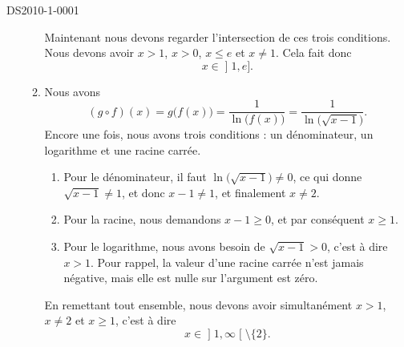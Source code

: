 \begin{corrige}{DS2010-1-0001}
\begin{enumerate}
\begin{enumerate}
\begin{enumerate}
					\end{enumerate}
					Maintenant nous devons regarder l'intersection de ces trois conditions. Nous devons avoir $x>1$, $x>0$, $x\leq e$ et $x\neq 1$. Cela fait donc
					\begin{equation}
						x\in\mathopen] 1 , e \mathclose].
					\end{equation}
				\item
					Nous avons
					\begin{equation}
						(g\circ f)(x)=g\big( f(x) \big)=\frac{1}{ \ln\big( f(x) \big) }=\frac{1}{ \ln\big( \sqrt{x-1} \big) }.
					\end{equation}
					Encore une fois, nous avons trois conditions : un dénominateur, un logarithme et une racine carrée.
					\begin{enumerate}
						\item
							Pour le dénominateur, il faut $\ln\big( \sqrt{x-1} \big)\neq 0$, ce qui donne $\sqrt{x-1}\neq 1$, et donc $x-1\neq 1$, et finalement $x\neq 2$.
						\item
							Pour la racine, nous demandons $x-1\geq 0$, et par conséquent $x\geq 1$.
						\item
							Pour le logarithme, nous avons besoin de $\sqrt{x-1}>0$, c'est à dire $x> 1$. Pour rappel, la valeur d'une racine carrée n'est jamais négative, mais elle est nulle sur l'argument est zéro.
					\end{enumerate}
					En remettant tout ensemble, nous devons avoir simultanément $x> 1$, $x\neq 2$ et $x\geq 1$, c'est à dire
					\begin{equation}
						x\in\mathopen] 1 , \infty \mathclose[\setminus\{ 2 \}.
					\end{equation}
					
			\end{enumerate}
	\end{enumerate}

\end{corrige}
